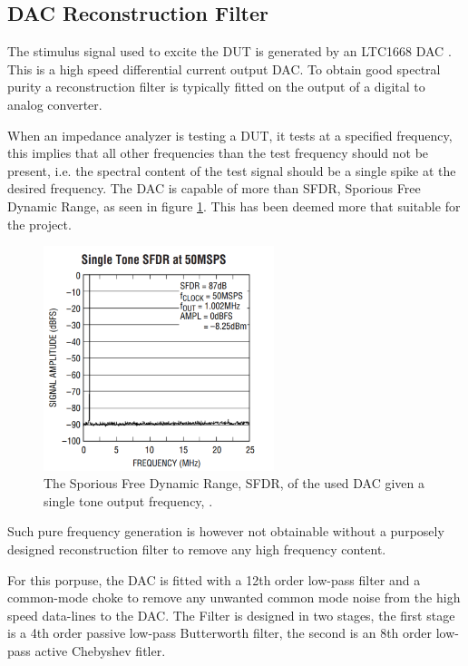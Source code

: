 \subsection{DAC Reconstruction Filter} \label{subsec:DAC_Filter}
The stimulus signal used to excite the DUT is generated by an LTC1668 DAC \cite{DAC_LTC1668}. This is a high speed differential current output DAC. To obtain good spectral purity a reconstruction filter is typically fitted on the output of a digital to analog converter.

When an impedance analyzer is testing a DUT, it tests at a specified frequency, this implies that all other frequencies than the test frequency should not be present, i.e. the spectral content of the test signal should be a single spike at the desired frequency. The DAC is capable of more than  SFDR, Sporious Free Dynamic Range, as seen in figure \ref{fig_7_1_1_SFDR}. This has been deemed more that suitable for the project. 

\begin{figure}[H]
    \centering
    \includegraphics[clip, trim=0 0 0 0, width=0.6\textwidth]{Sections/7_SystemDesign/Figures/7_1_1_DAC_SingleTone_SFDR.pdf}
    \caption{The Sporious Free Dynamic Range, SFDR, of the used DAC given a single tone output frequency, \cite{DAC_LTC1668}.}
    \label{fig_7_1_1_SFDR}
\end{figure}

Such pure frequency generation is however not obtainable without a purposely designed reconstruction filter to remove any high frequency content.

For this porpuse, the DAC is fitted with a 12th order low-pass filter and a common-mode choke to remove any unwanted common mode noise from the high speed data-lines to the DAC. The Filter is designed in two stages, the first stage is a 4th order passive low-pass Butterworth filter, the second is an 8th order low-pass active Chebyshev fitler.

